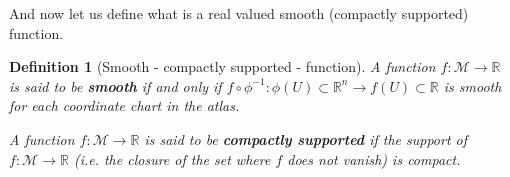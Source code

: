\documentclass[10pt]{book}
\newcommand{\Mcal}{\mathcal{M}}
\newcommand{\Ncal}{\mathcal{N}}
\newcommand{\Rbb}{\mathbb{R}}
\theoremstyle{break}
\newtheorem{definition}{Definition}
\begin{document}
%
%
%
%
%
%
%
%
\bigskip


And now let us define what is a real valued smooth (compactly supported) function.


\begin{definition}[Smooth - compactly supported - function]
A function $f : \Mcal \to \Rbb$ is said to be \textbf{smooth} if and only if $f \circ \phi^{-1} : \phi(U) \subset \Rbb^n \to f(U) \subset \Rbb$ is smooth for each coordinate chart in the atlas.\par%
A function $f : \Mcal \to \Rbb$ is said to be \textbf{compactly supported} if the support of $f : \Mcal \to \Rbb$ (i.e. the closure of the set where $f$ does not vanish) is compact. 
\end{definition}
\end{document}
